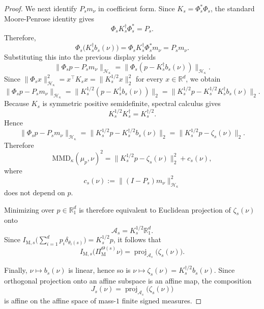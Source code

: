 \documentclass[10pt,a4paper]{amsart}
\begin{document}
\begin{proof}
We next identify $P_s m_\nu$ in coefficient form. Since $K_s=\Phi_s^*\Phi_s$, the standard Moore-Penrose identity gives
\begin{equation}
\Phi_s K_s^\dagger \Phi_s^* = P_s .
\end{equation}
Therefore,
\begin{equation}
\Phi_s\bigl(K_s^\dagger b_s(\nu)\bigr) = \Phi_s K_s^\dagger \Phi_s^* m_\nu = P_s m_\nu .
\end{equation}
Substituting this into the previous display yields
\begin{equation}
\lVert \Phi_s p - P_s m_\nu \rVert_{\mathcal H_\kappa} = \lVert \Phi_s(p-K_s^\dagger b_s(\nu)) \rVert_{\mathcal H_\kappa}.
\end{equation}
Since $\lVert \Phi_s x \rVert_{\mathcal H_\kappa}^2 = x^\top K_s x = \lVert K_s^{1/2}x \rVert_2^2$ for every $x \in \mathbb R^d$, we obtain
\begin{equation}
\lVert \Phi_s p - P_s m_\nu \rVert_{\mathcal H_\kappa} = \lVert K_s^{1/2}(p-K_s^\dagger b_s(\nu)) \rVert_2 = \lVert K_s^{1/2}p - K_s^{1/2}K_s^\dagger b_s(\nu) \rVert_2 .
\end{equation}
Because $K_s$ is symmetric positive semidefinite, spectral calculus gives
\begin{equation}
K_s^{1/2}K_s^\dagger = K_s^{\dagger/2}.
\end{equation}
Hence
\begin{equation}
\lVert \Phi_s p - P_s m_\nu \rVert_{\mathcal H_\kappa} = \lVert K_s^{1/2}p - K_s^{\dagger/2} b_s(\nu) \rVert_2 = \lVert K_s^{1/2}p - \zeta_s(\nu) \rVert_2 .
\end{equation}
Therefore
\begin{equation}
\mathrm{MMD}_\kappa(\mu_p,\nu)^2 = \lVert K_s^{1/2}p - \zeta_s(\nu) \rVert_2^2 + c_s(\nu),
\end{equation}
where
\begin{equation}
c_s(\nu) := \lVert (I-P_s)m_\nu \rVert_{\mathcal H_\kappa}^2
\end{equation}
does not depend on $p$.

Minimizing over $p \in \mathbb R_1^d$ is therefore equivalent to Euclidean projection of $\zeta_s(\nu)$ onto
\begin{equation}
\mathcal A_s = K_s^{1/2}\mathbb R_1^d .
\end{equation}
Since $I_{\mathrm M,s}\bigl(\sum_{i=1}^d p_i\delta_{\theta_i(s)}\bigr)=K_s^{1/2}p$, it follows that
\begin{equation}
I_{\mathrm M,s}\bigl(\Pi_{\mathrm M}^{\Theta(s)}\nu\bigr) = \operatorname{proj}_{\mathcal A_s}\bigl(\zeta_s(\nu)\bigr).
\end{equation}

Finally, $\nu \mapsto b_s(\nu)$ is linear, hence so is $\nu \mapsto \zeta_s(\nu)=K_s^{\dagger/2}b_s(\nu)$. Since orthogonal projection onto an affine subspace is an affine map, the composition
\begin{equation}
J_s(\nu) = \operatorname{proj}_{\mathcal A_s}\bigl(\zeta_s(\nu)\bigr)
\end{equation}
is affine on the affine space of mass-$1$ finite signed measures.
\end{proof}
\end{document}
